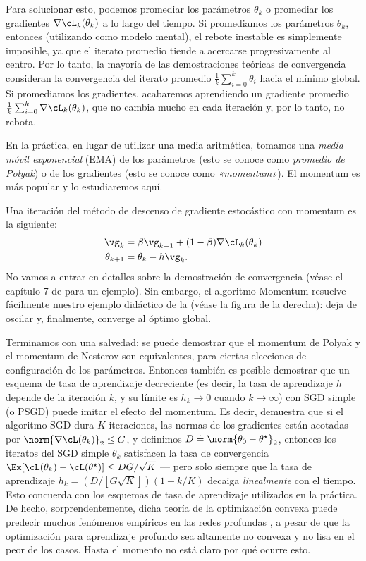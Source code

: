 \documentclass[../../book-main_es.tex]{subfiles}
\begin{document}
Para solucionar esto, podemos promediar los parámetros
\(\theta_{k}\) o promediar los gradientes \(\nabla
\cL_{k}(\theta_{k})\) a lo largo del tiempo. Si promediamos los parámetros
\(\theta_{k}\), entonces (utilizando  como modelo mental), 
el rebote inestable es simplemente imposible,
ya que el iterato promedio tiende a acercarse progresivamente al centro. Por lo tanto,
la mayoría de las demostraciones teóricas de convergencia consideran la convergencia del
iterato promedio \(\frac{1}{k}\sum_{i = 0}^{k}\theta_{i}\) hacia el
mínimo global. Si promediamos los gradientes, acabaremos aprendiendo
un gradiente promedio \(\frac{1}{k}\sum_{i = 0}^{k}\nabla
\cL_{k}(\theta_{k})\), que no cambia mucho en cada iteración
y, por lo tanto, no rebota.

En la práctica, en lugar de utilizar una media aritmética, tomamos una
\textit{media móvil exponencial} (EMA) de los parámetros (esto
se conoce como \textit{promedio de Polyak}) o de los gradientes (esto
se conoce como \textit{«momentum»}). El momentum es más popular y lo estudiaremos aquí.

Una iteración del método de descenso de gradiente estocástico con momentum es la siguiente:
\begin{align}
    \vg_{k}
    &= \beta\vg_{k - 1} + (1 - \beta)\nabla \cL_{k}(\theta_{k}) \\
    \theta_{k + 1}
    &= \theta_{k} - h\vg_{k}.
\end{align}
No vamos a entrar en detalles sobre la demostración de convergencia (véase el capítulo 7 de
\cite{garrigos2023handbook} para un ejemplo). Sin embargo, el algoritmo Momentum
resuelve fácilmente nuestro ejemplo didáctico de la  (véase la
figura de la derecha): deja de oscilar y, finalmente, converge 
al óptimo global.

Terminamos con una salvedad: se puede demostrar que el momentum de Polyak y el momentum de Nesterov
son equivalentes, para ciertas elecciones de configuración de los parámetros.
Entonces también es posible demostrar que un esquema de tasa de aprendizaje decreciente
(es decir, la tasa de aprendizaje \(h\) depende de la iteración
\(k\), y su límite es \(h_{k} \to 0\) cuando \(k \to \infty\)) con
SGD simple (o PSGD) puede imitar el efecto del momentum. Es decir,
\cite{defazio2023optimal} demuestra que si el algoritmo SGD dura \(K\)
iteraciones, las normas de los gradientes están acotadas por \(\norm{\nabla
\cL(\theta_{k})}_{2} \leq G\), y definimos \(D \doteq
\norm{\theta_{0} - \theta^{\star}}_{2}\), entonces los iteratos del SGD simple
\(\theta_{k}\) satisfacen la tasa de convergencia \(\Ex[\cL(\theta_{k}) -
\cL(\theta^{\star})] \leq DG/\sqrt{K}\) --- pero solo siempre que la
tasa de aprendizaje \(h_{k} = (D/[G\sqrt{K}])(1 - k/K)\) decaiga
\textit{linealmente} con el tiempo. Esto concuerda con los esquemas de tasa de aprendizaje
utilizados en la práctica. De hecho, sorprendentemente, dicha teoría de la optimización convexa
puede predecir muchos fenómenos empíricos en las redes profundas
\cite{schaipp2025surprising}, a pesar de que la optimización para aprendizaje profundo
sea altamente no convexa y no lisa en el peor de los casos. Hasta el momento
no está claro por qué ocurre esto.
\end{document}
